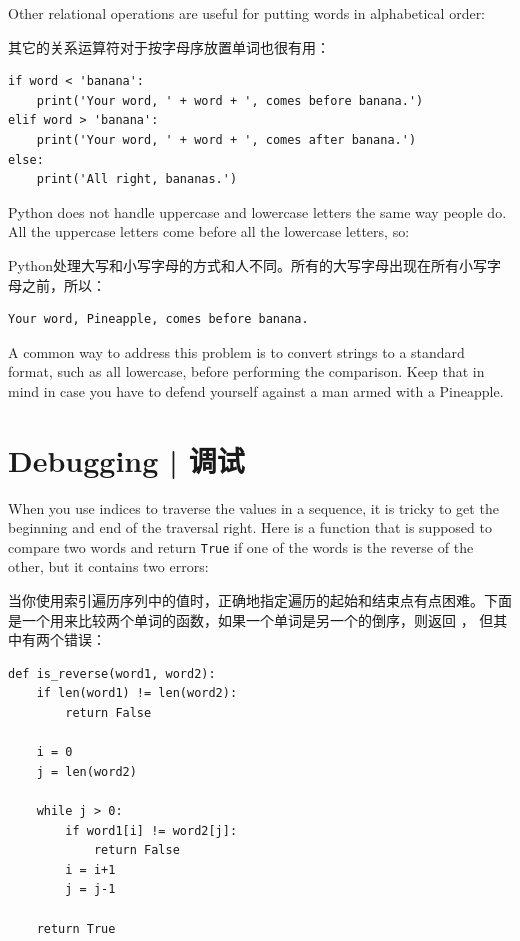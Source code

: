 %
Other relational operations are useful for putting words in alphabetical
order:

其它的关系运算符对于按字母序放置单词也很有用：

\begin{lstlisting}
if word < 'banana':
    print('Your word, ' + word + ', comes before banana.')
elif word > 'banana':
    print('Your word, ' + word + ', comes after banana.')
else:
    print('All right, bananas.')
\end{lstlisting}

%
Python does not handle uppercase and lowercase letters the same way
people do.  All the uppercase letters come before all the
lowercase letters, so:

Python处理大写和小写字母的方式和人不同。所有的大写字母出现在所有小写字母之前，所以：

\begin{lstlisting}
Your word, Pineapple, comes before banana.
\end{lstlisting}

%
A common way to address this problem is to convert strings to a
standard format, such as all lowercase, before performing the
comparison. Keep that in mind in case you have to defend yourself
against a man armed with a Pineapple.

\section{Debugging  |  调试}
  

When you use indices to traverse the values in a sequence,
it is tricky to get the beginning and end of the traversal
right.  Here is a function that is supposed to compare two
words and return {\tt True} if one of the words is the reverse
of the other, but it contains two errors:

当你使用索引遍历序列中的值时，正确地指定遍历的起始和结束点有点困难。下面是一个用来比较两个单词的函数，如果一个单词是另一个的倒序，则返回  ， 但其中有两个错误：

\begin{lstlisting}
def is_reverse(word1, word2):
    if len(word1) != len(word2):
        return False

    i = 0
    j = len(word2)

    while j > 0:
        if word1[i] != word2[j]:
            return False
        i = i+1
        j = j-1

    return True
\end{lstlisting}

